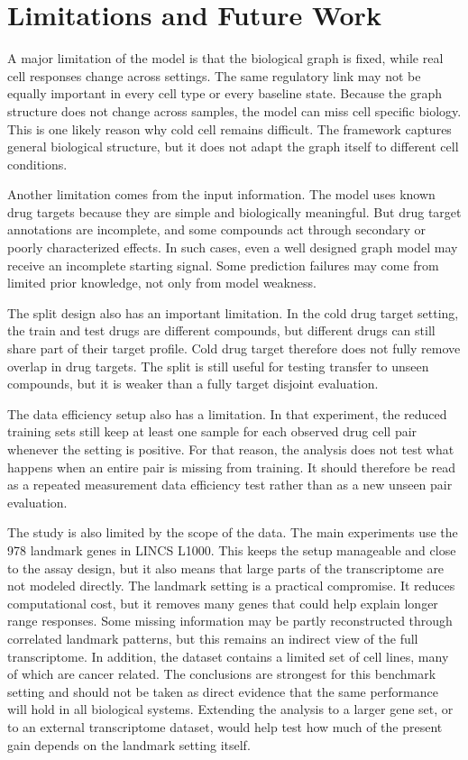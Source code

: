 \section{Limitations and Future Work}
\noindent A major limitation of the model is that the biological graph is fixed, while real cell responses change across settings. The same regulatory link may not be equally important in every cell type or every baseline state. Because the graph structure does not change across samples, the model can miss cell specific biology. This is one likely reason why cold cell remains difficult. The framework captures general biological structure, but it does not adapt the graph itself to different cell conditions.

\noindent Another limitation comes from the input information. The model uses known drug targets because they are simple and biologically meaningful. But drug target annotations are incomplete, and some compounds act through secondary or poorly characterized effects. In such cases, even a well designed graph model may receive an incomplete starting signal. Some prediction failures may come from limited prior knowledge, not only from model weakness.

\noindent The split design also has an important limitation. In the cold drug target setting, the train and test drugs are different compounds, but different drugs can still share part of their target profile. Cold drug target therefore does not fully remove overlap in drug targets. The split is still useful for testing transfer to unseen compounds, but it is weaker than a fully target disjoint evaluation.

\noindent The data efficiency setup also has a limitation. In that experiment, the reduced training sets still keep at least one sample for each observed drug cell pair whenever the setting is positive. For that reason, the analysis does not test what happens when an entire pair is missing from training. It should therefore be read as a repeated measurement data efficiency test rather than as a new unseen pair evaluation.

\noindent The study is also limited by the scope of the data. The main experiments use the 978 landmark genes in LINCS L1000. This keeps the setup manageable and close to the assay design, but it also means that large parts of the transcriptome are not modeled directly. The landmark setting is a practical compromise. It reduces computational cost, but it removes many genes that could help explain longer range responses. Some missing information may be partly reconstructed through correlated landmark patterns, but this remains an indirect view of the full transcriptome. In addition, the dataset contains a limited set of cell lines, many of which are cancer related. The conclusions are strongest for this benchmark setting and should not be taken as direct evidence that the same performance will hold in all biological systems. Extending the analysis to a larger gene set, or to an external transcriptome dataset, would help test how much of the present gain depends on the landmark setting itself.

